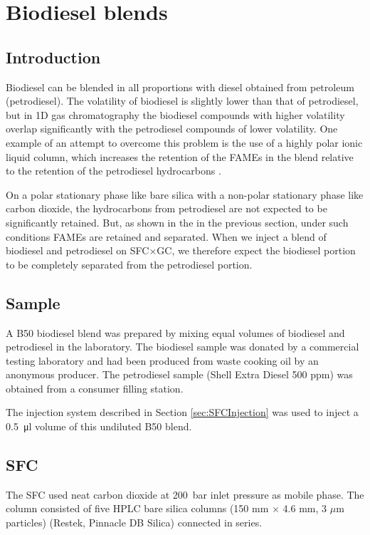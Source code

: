 \section{Biodiesel blends}

\subsection{Introduction}
Biodiesel can be blended in all proportions with diesel obtained from petroleum
(petrodiesel). The volatility of biodiesel is slightly lower than that of
petrodiesel, but in 1D gas chromatography the biodiesel compounds with higher
volatility overlap significantly with the petrodiesel compounds of lower
volatility. One example of an attempt to overcome this problem is the use of a
highly polar ionic liquid column, which increases the retention of the FAMEs in
the blend relative to the retention of the petrodiesel hydrocarbons
\autocite{Ragonese2009}.

On a polar stationary phase like bare silica with a non-polar stationary phase
like carbon dioxide, the hydrocarbons from petrodiesel are not expected to be
significantly retained. But, as shown in the in the previous section, under such
conditions FAMEs are retained and separated. When we inject a blend of biodiesel
and petrodiesel on SFC×GC, we therefore expect the biodiesel portion to be
completely separated from the petrodiesel portion.

\subsection{Sample}

A B50 biodiesel blend was prepared by mixing equal volumes of biodiesel and
petrodiesel in the laboratory. The biodiesel sample was donated by a commercial
testing laboratory and had been produced from waste cooking oil by an anonymous
producer. The petrodiesel sample (Shell Extra Diesel 500 ppm) was obtained from
a consumer filling station.

The injection system described in Section \ref{sec:SFCInjection} was used to
inject a \SI{0.5}{\micro\litre} volume of this undiluted B50 blend.

\subsection{SFC}

The SFC used neat carbon dioxide at \SI{200}{\bar} inlet pressure as mobile
phase. The column consisted of five HPLC bare silica columns (150 mm $\times$
4.6 mm, 3 $\mu$m particles) (Restek, Pinnacle DB Silica) connected in series.

